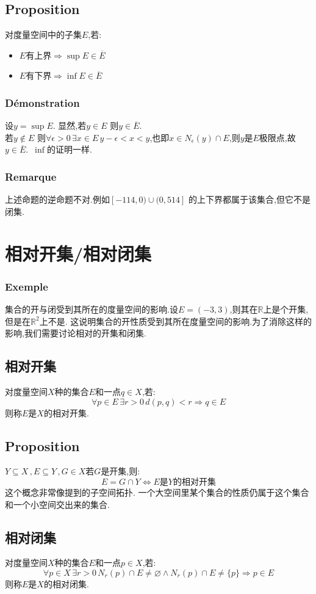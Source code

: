 \documentclass[12pt, a4paper, oneside]{ctexbook}
\newcommand{\R }{\mathbb{R}}%
\begin{document}
  \subsection{Proposition}
  对度量空间中的子集$E$,若:
  \begin{itemize}
    \item $E$有上界$\Rightarrow \sup E\in \overline{E}$
    \item $E$有下界$\Rightarrow \inf E\in \overline{E}$
  \end{itemize}
  \subsubsection{Démonstration}
  \noindent
  设$y=\sup E$.
  显然,若$y\in E$ 则$y\in \overline{E}$.\\
  若$y\notin E$ 则$\forall\epsilon>0\,\exists x\in E\, y-\epsilon<x<y $,也即$x\in N_\epsilon(y)\cap E$,则$y$是$E$极限点,故$y\in \overline{E}$.\
  $\inf$的证明一样.
  \subsubsection{Remarque}
  上述命题的逆命题不对.例如$[-114,0)\cup(0,514]$ 的上下界都属于该集合,但它不是闭集.
\section{相对开集/相对闭集}
  \subsubsection{Exemple}
  集合的开与闭受到其所在的度量空间的影响.设$E=(-3,3)$,则其在$\R$上是个开集,但是在$\R^2$上不是.
  这说明集合的开性质受到其所在度量空间的影响.为了消除这样的影响,我们需要讨论相对的开集和闭集.
  \subsection{相对开集}
  对度量空间$X$种的集合$E$和一点$q\in X$,若:
  $$
  \forall p\in E\,\exists r>0\,d(p,q)<r \Rightarrow q\in E
  $$
  则称$E$是$X$的相对开集.
  \subsection{Proposition}
  $Y\subseteq X\,,E\subseteq Y\,,G\in X$若$G$是开集,则:
  $$
  E=G\cap Y\Leftrightarrow E\text{是}Y\text{的相对开集}
  $$
  这个概念非常像提到的子空间拓扑.
  一个大空间里某个集合的性质仍属于这个集合和一个小空间交出来的集合.
  \subsection{相对闭集}
  对度量空间$X$种的集合$E$和一点$p\in X$,若:
  $$
  \forall p\in X\, \exists r>0\, N_r(p)\cap E\neq \varnothing\land N_r(p)\cap E\neq\{p\}\Rightarrow p\in E
  $$
  则称$E$是$X$的相对闭集.
\end{document}
